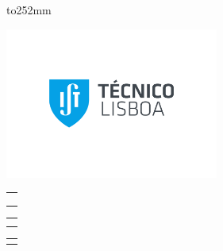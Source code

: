 %

\pagestyle{empty}

\enlargethispage{252mm minus \textheight}
\vbox to252mm {
%
%
\vspace*{-16.5mm}
\hspace*{-14.5mm}\includegraphics[bb=90 185 765 395,clip,width=70mm]{images/Logo_IST.pdf} %

\vspace*{15mm}

%
%
\hspace*{-10.5mm}
\begin{tabular}{p{155.5mm}}
\centering{\sffamily\bfseries\huge UNIVERSIDADE DE LISBOA}\\
\centering{\sffamily\bfseries\huge INSTITUTO SUPERIOR T\'{E}CNICO}\\
\smallskip
\end{tabular}

\vspace*{15mm} %

%
%
\hspace*{-10.5mm}
\begin{tabular}{p{155.5mm}}
\centering{\sffamily\bfseries\LARGE Big Data Privacy by Design Computation Platform}\\
\smallskip
\end{tabular}

\vspace*{15mm}

%
%
\hspace*{-10.5mm}
\begin{tabular}{p{155.5mm}}
\centering{\sffamily\bfseries\Large Rui Nuno Lopes Claro}\\
\end{tabular}

}
